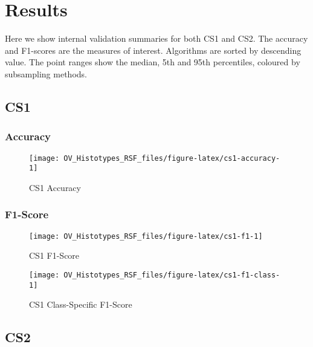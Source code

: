 \documentclass[
]{report}
\begin{document}
\hypertarget{results}{%
\chapter{Results}\label{results}}

Here we show internal validation summaries for both CS1 and CS2. The accuracy and F1-scores are the measures of interest. Algorithms are sorted by descending value. The point ranges show the median, 5th and 95th percentiles, coloured by subsampling methods.

\hypertarget{cs1}{%
\section{CS1}\label{cs1}}

\hypertarget{accuracy}{%
\subsection{Accuracy}\label{accuracy}}

\begin{figure}[H]

{\centering \texttt{[image: OV\_Histotypes\_RSF\_files/figure-latex/cs1-accuracy-1]} 

}

\caption{CS1 Accuracy}\label{fig:cs1-accuracy}
\end{figure}

\hypertarget{f1-score}{%
\subsection{F1-Score}\label{f1-score}}

\begin{figure}[H]

{\centering \texttt{[image: OV\_Histotypes\_RSF\_files/figure-latex/cs1-f1-1]} 

}

\caption{CS1 F1-Score}\label{fig:cs1-f1}
\end{figure}

\begin{figure}[H]

{\centering \texttt{[image: OV\_Histotypes\_RSF\_files/figure-latex/cs1-f1-class-1]} 

}

\caption{CS1 Class-Specific F1-Score}\label{fig:cs1-f1-class}
\end{figure}

\hypertarget{cs2}{%
\section{CS2}\label{cs2}}
\end{document}

